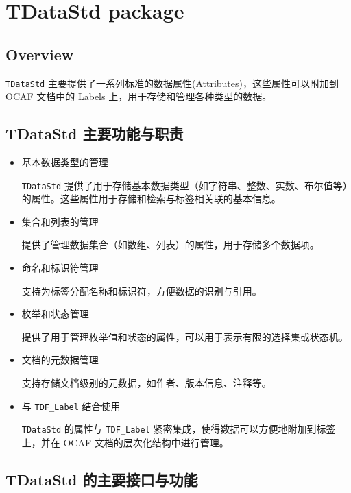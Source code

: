 \documentclass[11pt]{article}
\begin{document}
\section{TDataStd package}
\label{sec:orgbe8d23c}

\subsection{Overview}
\label{sec:org9937773}

\texttt{TDataStd} 主要提供了一系列标准的数据属性(Attributes)，这些属性可以附加到 OCAF 文档中的 Labels 上，用于存储和管理各种类型的数据。
\subsection{TDataStd 主要功能与职责}
\label{sec:org01e6f62}

\begin{itemize}
\item 基本数据类型的管理

\texttt{TDataStd} 提供了用于存储基本数据类型（如字符串、整数、实数、布尔值等）的属性。这些属性用于存储和检索与标签相关联的基本信息。

\item 集合和列表的管理

提供了管理数据集合（如数组、列表）的属性，用于存储多个数据项。

\item 命名和标识符管理

支持为标签分配名称和标识符，方便数据的识别与引用。

\item 枚举和状态管理

提供了用于管理枚举值和状态的属性，可以用于表示有限的选择集或状态机。

\item 文档的元数据管理

支持存储文档级别的元数据，如作者、版本信息、注释等。

\item 与 \texttt{TDF\_Label} 结合使用

\texttt{TDataStd} 的属性与 \texttt{TDF\_Label} 紧密集成，使得数据可以方便地附加到标签上，并在 OCAF 文档的层次化结构中进行管理。
\end{itemize}
\subsection{TDataStd 的主要接口与功能}
\label{sec:org7157bb1}
\end{document}
